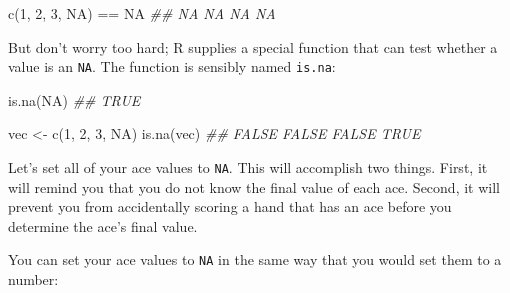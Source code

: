 \documentclass[
  letterpaper,
  DIV=11,
  numbers=noendperiod]{scrbook}
\newenvironment{Shaded}{\begin{snugshade}}{\end{snugshade}}
\newcommand{\ConstantTok}[1]{\textcolor[rgb]{0.56,0.35,0.01}{#1}}
\newcommand{\DecValTok}[1]{\textcolor[rgb]{0.68,0.00,0.00}{#1}}
\newcommand{\DocumentationTok}[1]{\textcolor[rgb]{0.37,0.37,0.37}{\textit{#1}}}
\newcommand{\FunctionTok}[1]{\textcolor[rgb]{0.28,0.35,0.67}{#1}}
\newcommand{\NormalTok}[1]{\textcolor[rgb]{0.00,0.23,0.31}{#1}}
\newcommand{\OtherTok}[1]{\textcolor[rgb]{0.00,0.23,0.31}{#1}}
\newcommand{\SpecialCharTok}[1]{\textcolor[rgb]{0.37,0.37,0.37}{#1}}
\newcommand{\StringTok}[1]{\textcolor[rgb]{0.13,0.47,0.30}{#1}}
\begin{document}
\begin{Shaded}
\begin{Highlighting}[]
\FunctionTok{c}\NormalTok{(}\DecValTok{1}\NormalTok{, }\DecValTok{2}\NormalTok{, }\DecValTok{3}\NormalTok{, }\ConstantTok{NA}\NormalTok{) }\SpecialCharTok{==} \ConstantTok{NA}
\DocumentationTok{\#\# NA NA NA NA}
\end{Highlighting}
\end{Shaded}

But don't worry too hard; R supplies a special function that can test
whether a value is an \texttt{NA}. The function is sensibly named
\texttt{is.na}:

\begin{Shaded}
\begin{Highlighting}[]
\FunctionTok{is.na}\NormalTok{(}\ConstantTok{NA}\NormalTok{)}
\DocumentationTok{\#\# TRUE}

\NormalTok{vec }\OtherTok{\textless{}{-}} \FunctionTok{c}\NormalTok{(}\DecValTok{1}\NormalTok{, }\DecValTok{2}\NormalTok{, }\DecValTok{3}\NormalTok{, }\ConstantTok{NA}\NormalTok{)}
\FunctionTok{is.na}\NormalTok{(vec)}
\DocumentationTok{\#\# FALSE FALSE FALSE  TRUE}
\end{Highlighting}
\end{Shaded}

Let's set all of your ace values to \texttt{NA}. This will accomplish
two things. First, it will remind you that you do not know the final
value of each ace. Second, it will prevent you from accidentally scoring
a hand that has an ace before you determine the ace's final value.

You can set your ace values to \texttt{NA} in the same way that you
would set them to a number:

\begin{Shaded}
\end{Shaded}
\end{document}
